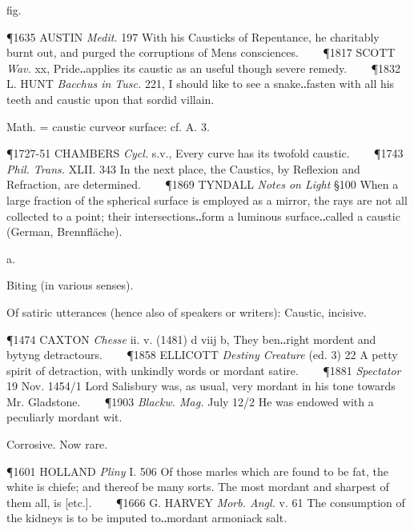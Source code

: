 \begin{description}[wide, labelwidth=!, labelindent=0pt]
\begin{myenumerate}
 fig.

\P 1635 AUSTIN  \textit{Medit.} 197 With his Causticks of Repentance, he charitably burnt out, and purged the corruptions of Mens consciences.    
\P 1817 SCOTT  \textit{Wav.} xx, Pride‥applies its caustic as an useful though severe remedy.    
\P 1832 L. HUNT  \textit{Bacchus in Tusc.} 221, I should like to see a snake‥fasten with all his teeth and caustic upon that sordid villain.

 Math. = caustic curveor surface: cf. A. 3.

\P 1727-51 CHAMBERS  \textit{Cycl.} s.v., Every curve has its twofold caustic.    
\P 1743  \textit{Phil. Trans.} XLII. 343 In the next place, the Caustics, by Reflexion and Refraction, are determined.    
\P 1869 TYNDALL  \textit{Notes on Light} §100 When a large fraction of the spherical surface is employed as a mirror, the rays are not all collected to a point; their intersections‥form a luminous surface‥called a caustic (German, Brennfläche).
\end{myenumerate}


 a.

\noindent {}

\noindent [a. F. mordant, pres. pple. of mordre to bite:—popular L. *mordĕre (= classical L. mordēre); the form mordent is assimilated to the L. pple. mordentem.]
\vspace{-0.3cm}

Biting (in various senses).

\begin{myenumerate}
 Of satiric utterances (hence also of speakers or writers): Caustic, incisive.

\P 1474 CAXTON  \textit{Chesse} ii. v. (1481) d viij b, They ben‥right mordent and bytyng detractours.    
\P 1858 ELLICOTT  \textit{Destiny Creature} (ed. 3) 22 A petty spirit of detraction, with unkindly words or mordant satire.    
\P 1881  \textit{Spectator} 19 Nov. 1454/1 Lord Salisbury was, as usual, very mordant in his tone towards Mr. Gladstone.    
\P 1903  \textit{Blackw. Mag.} July 12/2 He was endowed with a peculiarly mordant wit.

 Corrosive. Now rare.

\P 1601 HOLLAND  \textit{Pliny} I. 506 Of those marles which are found to be fat, the white is chiefe; and thereof be many sorts. The most mordant and sharpest of them all, is [etc.].    
\P 1666 G. HARVEY  \textit{Morb. Angl.} v. 61 The consumption of the kidneys is to be imputed to‥mordant armoniack salt.


\end{myenumerate}
\end{description}
